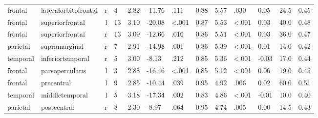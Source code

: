 \documentclass{article}
\begin{document}
\begin{longtable}{llrR{1.5cm}R{1cm}R{1.3cm}R{1cm}R{1cm}R{1.3cm}R{1cm}R{1.8cm}R{1.3cm}R{1.8cm}}
   frontal &      lateralorbitofrontal &    r &            4 &                  2.82 &           -11.76 &               .111 &                               0.88 &                          5.57 &                            .030 &  0.05 &   24.5 &      0.45 \\
   frontal &           superiorfrontal &    l &           13 &                  3.10 &           -20.08 &      \textless.001 &                               0.87 &                          5.53 &                   \textless.001 &  0.03 &   40.0 &      0.48 \\
   frontal &           superiorfrontal &    r &           13 &                  3.09 &           -12.66 &               .016 &                               0.86 &                          5.51 &                   \textless.001 &  0.03 &   36.0 &      0.47 \\
  parietal &             supramarginal &    r &            7 &                  2.91 &           -14.98 &               .001 &                               0.86 &                          5.39 &                   \textless.001 &  0.01 &   14.0 &      0.42 \\
  temporal &          inferiortemporal &    r &            5 &                  3.00 &            -8.13 &               .212 &                               0.85 &                          5.36 &                   \textless.001 & -0.03 &   17.0 &      0.44 \\
   frontal &           parsopercularis &    l &            3 &                  2.88 &           -16.46 &      \textless.001 &                               0.85 &                          5.12 &                   \textless.001 &  0.06 &   19.0 &      0.45 \\
   frontal &                precentral &    l &            9 &                  2.85 &           -10.44 &               .039 &                               0.95 &                          4.92 &                            .006 &  0.02 &   60.0 &      0.51 \\
  temporal &            middletemporal &    l &            5 &                  3.18 &           -17.34 &               .002 &                               0.83 &                          4.86 &                   \textless.001 & -0.01 &   10.0 &      0.40 \\
  parietal &               postcentral &    r &            8 &                  2.30 &            -8.97 &               .064 &                               0.95 &                          4.74 &                            .005 &  0.00 &   14.5 &      0.43 \\

\end{longtable}
\end{document}

